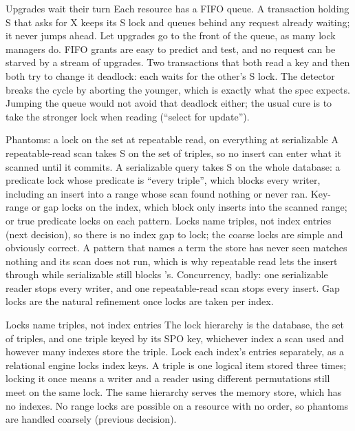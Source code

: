 \begin{decision}{Upgrades wait their turn}
 Each resource has a FIFO queue. A transaction holding S that
asks for X keeps its S lock and queues behind any request already waiting; it
never jumps ahead.
 Let upgrades go to the front of the queue, as many lock
managers do.
 FIFO grants are easy to predict and test, and no request can be
starved by a stream of upgrades.
 Two transactions that both read a key and then both try to change
it deadlock: each waits for the other's S lock. The detector breaks the cycle
by aborting the younger, which is exactly what the 
spec expects. Jumping the queue would not avoid that deadlock either; the usual
cure is to take the stronger lock when reading (``select for update'').
\end{decision}

\begin{decision}{Phantoms: a lock on the set at repeatable read, on everything at serializable}
 A repeatable-read scan takes S on the set of triples, so no
insert can enter what it scanned until it commits. A serializable query takes
S on the whole database: a predicate lock whose predicate is ``every triple'',
which blocks every writer, including an insert into a range whose scan found
nothing or never ran.
 Key-range or gap locks on the index, which block only
inserts into the scanned range; or true predicate locks on each pattern.
 Locks name triples, not index entries (next decision), so there is
no index gap to lock; the coarse locks are simple and obviously correct. A
pattern that names a term the store has never seen matches nothing and its
scan does not run, which is why repeatable read lets the
 insert through while serializable still blocks
's.
 Concurrency, badly: one serializable reader stops every writer,
and one repeatable-read scan stops every insert. Gap locks are the natural
refinement once locks are taken per index.
\end{decision}

\begin{decision}{Locks name triples, not index entries}
 The lock hierarchy is the database, the set of triples, and one
triple keyed by its SPO key, whichever index a scan used and however many
indexes store the triple.
 Lock each index's entries separately, as a relational
engine locks index keys.
 A triple is one logical item stored three times; locking it once
means a writer and a reader using different permutations still meet on the
same lock. The same hierarchy serves the memory store, which has no indexes.
 No range locks are possible on a resource with no order, so
phantoms are handled coarsely (previous decision).
\end{decision}

